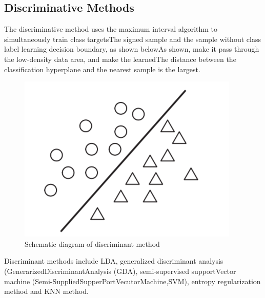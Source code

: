 \documentclass[11pt,en]{elegantpaper}
\begin{document}
\subsection{Discriminative Methods}
The discriminative method\cite{zhang2017label} uses the maximum interval algorithm to simultaneously train class targetsThe signed sample and the sample without class label learning decision boundary, as shown belowAs shown, make it pass through the low-density data area, and make the learnedThe distance between the classification hyperplane and the nearest sample is the largest.
\begin{figure}[H]
		\centering
		\includegraphics[scale=0.4]{figure/2.png}
		\caption{Schematic diagram of discriminant method}
\end{figure}
Discriminant methods include LDA\cite{alshehhi2017hierarchical}, generalized discriminant analysis (GenerarizedDiscriminantAnalysis (GDA), semi-supervised supportVector machine (Semi-SuppliedSupperPortVecutorMachine,SVM), entropy regularization method and KNN method.
\end{document}

